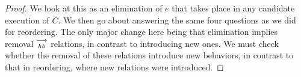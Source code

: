 \begin{proof}
    We look at this as an elimination of $e$ that takes place in any candidate execution of $C$. 
    We then go about answering the same four questions as we did for reordering. 
    The only major change here being that elimination implies removal $\stackrel{\longrightarrow}{_{hb}}$ relations, in contrast to introducing new ones.
    We must check whether the removal of these relations introduce new behaviors, in contrast to that in reordering, where new relations were introduced. 
    
    
    
    
    
    
\end{proof}